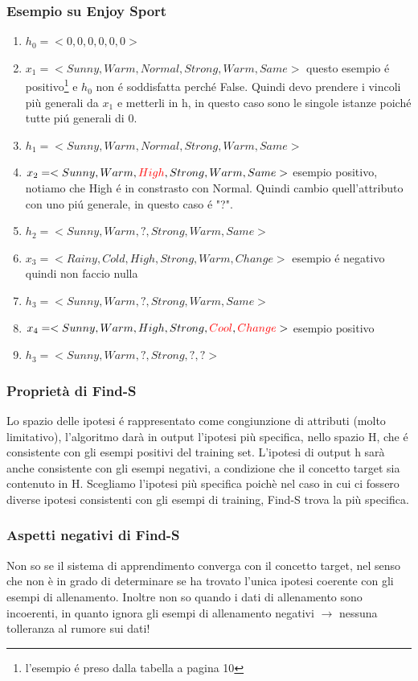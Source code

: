 \documentclass{article}
\begin{document}
\subsubsection{Esempio su Enjoy Sport}
\begin{enumerate}
    \item $h_0 = <0, 0, 0, 0, 0, 0>$
    \item $x_1 = <Sunny, Warm, Normal, Strong, Warm, Same>$ \quad questo esempio é positivo\footnote{l'esempio é preso dalla tabella a pagina 10} e $h_0$ non é soddisfatta perché False. Quindi devo prendere i vincoli più generali da $x_1$ e metterli in h, in questo caso sono le singole istanze poiché tutte piú generali di 0.
    \item $h_1 = <Sunny, Warm, Normal, Strong, Warm, Same>$
    \item $x_2 = <Sunny, Warm, \textcolor{red}{High}, Strong, Warm, Same>$ \quad esempio positivo, notiamo che High é in constrasto con Normal. Quindi cambio quell'attributo con uno piú generale, in questo caso é "?".
    \item $h_2 = <Sunny, Warm, ?, Strong, Warm, Same>$
    \item $x_3 = <Rainy, Cold, High, Strong, Warm, Change>$ \quad esempio é negativo quindi non faccio nulla
    \item $h_3 = <Sunny, Warm, ?, Strong, Warm, Same>$
    \item $x_4 = <Sunny, Warm, High, Strong, \textcolor{red}{Cool}, \textcolor{red}{Change}>$ \quad esempio positivo
    \item $h_3 = <Sunny, Warm, ?, Strong, ?, ?>$
\end{enumerate}

\subsubsection{Proprietà di Find-S}
Lo spazio delle ipotesi é rappresentato come congiunzione di attributi (molto limitativo), l'algoritmo darà in output l'ipotesi più specifica, nello spazio H, che é consistente con gli esempi positivi del training set. L'ipotesi di output h sarà anche consistente con gli esempi negativi, a condizione che il concetto target sia contenuto in H. Scegliamo l'ipotesi più specifica poichè nel caso in cui ci fossero diverse ipotesi consistenti con gli esempi di training, Find-S trova la più specifica.

\subsubsection{Aspetti negativi di Find-S}
Non so se il sistema di apprendimento converga con il concetto target, nel senso che non è in grado di determinare se ha trovato l'unica ipotesi coerente con gli esempi di allenamento. Inoltre non so quando i dati di allenamento sono incoerenti, in quanto ignora gli esempi di allenamento negativi $\rightarrow$ nessuna tolleranza al rumore sui dati!
\end{document}
